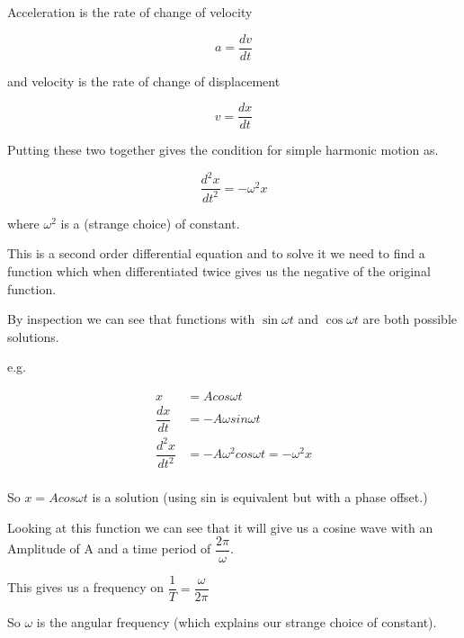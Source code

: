 \documentclass[main.tex]{subfiles}
\begin{document}


Acceleration is the rate of change of velocity 

\[
a = \dfrac{dv}{dt} 
\]

and velocity is the rate of change of displacement

\[
v = \dfrac{dx}{dt} 
\]

Putting these two together gives the condition for simple harmonic motion as.

\[
\dfrac{d^2x}{dt^2}=-\omega ^2 x
\]

where $\omega ^2$ is a (strange choice) of constant.

This is a second order differential equation and to solve it we need to find a function which when differentiated twice gives us the negative of the original function.

By inspection we can see that functions with $\sin \omega t$ and $\cos \omega t$ are both possible solutions.

e.g.

\begin{align*} 
x &= A cos \omega t \\
\dfrac{dx}{dt} &= - A\omega sin \omega t \\
\dfrac{d^2x}{dt^2} &= -A\omega^2 cos \omega t = -\omega ^2 x \\
\end{align*}

So $x= Acos \omega t$ is a solution (using sin is equivalent but with a phase offset.)

Looking at this function we can see that it will give us a cosine wave with an Amplitude of A and a time period of $ \dfrac{2 \pi}{\omega}$.

This gives us a frequency on $\dfrac{1}{T} = \dfrac{\omega}{2 \pi}$

So $\omega$ is the angular frequency (which explains our strange choice of constant).

\end{document}
